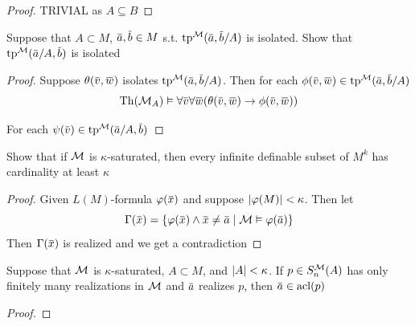 \documentclass[11pt]{article}
\begin{document}
\begin{proof}
TRIVIAL as \(A\subseteq B\)
\end{proof}

\begin{exercise}
\label{ex4.5.11}
Suppose that \(A\subset M\), \(\bara,\barb\in M\) s.t. \(\tp^{\calm}(\bara,\barb/A)\) is isolated. Show
that \(\tp^{\calm}(\bara/A,\barb)\) is isolated
\end{exercise}


\begin{proof}
Suppose \(\theta(\barv,\barw)\) isolates \(\tp^{\calm}(\bara,\barb/A)\). Then for each \(\phi(\barv,\barw)\in\tp^{\calm}(\bara,\barb/A)\)
\begin{equation*}
\Th(\calm_A)\vDash\forall\barv\forall\barw(\theta(\barv,\barw)\to\phi(\barv,\barw))
\end{equation*}

For each \(\psi(\barv)\in\tp^{\calm}(\bara/A,\barb)\)
\end{proof}

\begin{exercise}
\label{ex4.5.31}
Show that if \(\mathcal{M}\) is \(\kappa\)-saturated, then every infinite definable subset of \(M^k\) has
cardinality at least \(\kappa\)
\end{exercise}

\begin{proof}
Given \(L(M)\)-formula \(\varphi(\barx)\) and suppose \(\abs{\varphi(M)}<\kappa\). Then let
\begin{equation*}
\Gamma(\barx)=\{\varphi(\barx)\wedge\barx\neq\bara\mid\calm\vDash\varphi(\bara)\}
\end{equation*}
Then \(\Gamma(\barx)\) is realized and we get a contradiction
\end{proof}

\begin{exercise}
\label{ex4.5.33}
Suppose that \(\mathcal{M}\) is \(\kappa\)-saturated, \(A\subset M\), and \(\abs{A}<\kappa\). If \(p\in S_n^{\mathcal{M}}(A)\) has only
finitely many realizations in \(\mathcal{M}\) and \(\bara\) realizes \(p\), then \(\bara\in\acl(p)\)
\end{exercise}

\begin{proof}

\end{proof}
\end{document}
